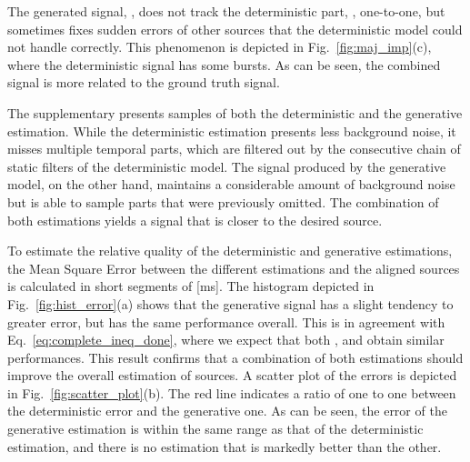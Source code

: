 \documentclass{article}
\theoremstyle{plain}
\theoremstyle{definition}
\theoremstyle{remark}
\begin{document}
 The generated signal, , does not track the deterministic part, , one-to-one, but sometimes fixes sudden errors of other sources that the deterministic model could not handle correctly. This phenomenon is depicted in Fig.~\ref{fig:maj_imp}(c), where the deterministic signal has some bursts. As can be seen, the combined signal is more related to the ground truth signal. 





The supplementary presents samples of both the deterministic and the generative estimation. While the deterministic estimation presents less background noise, it misses multiple temporal parts, which are filtered out by the consecutive chain of static filters of the deterministic model. The signal produced by the generative model, on the other hand, maintains a considerable amount of background noise but is able to sample parts that were previously omitted. The combination of both estimations yields a signal that is closer to the desired source.
 
 To estimate the relative quality of the deterministic and generative estimations, the Mean Square Error between the different estimations and the aligned sources is calculated in short segments of [ms]. The histogram depicted in Fig.~\ref{fig:hist_error}(a) shows that the generative signal  has a slight tendency to greater error, but has the same performance overall. This is in agreement with Eq.~\ref{eq:complete_ineq_done}, where we expect that both , and  obtain similar performances. This result confirms that a combination of both estimations should improve the overall estimation of sources. A scatter plot of the errors is depicted in Fig.~\ref{fig:scatter_plot}(b). The red line indicates a ratio of one to one between the deterministic error and the generative one. As can be seen, the error of the generative estimation is within the same range as that of the deterministic estimation, and there is no estimation that is markedly better than the other.
\end{document}
